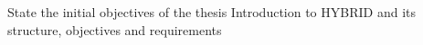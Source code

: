 State the initial objectives of the thesis
Introduction to HYBRID and its structure, objectives and requirements 
